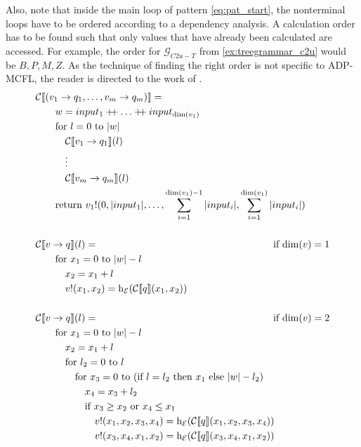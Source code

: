 \documentclass[
    a4paper,
    12pt,
    twoside,
    BCOR=12mm,
    parskip=half,
    chapterprefix,
    numbers=noenddot,
    bibliography=totoc
]{scrbook}
\begin{document}
Also, note that inside the main loop of pattern \ref{eq:pat_start}, the nonterminal loops have to be ordered according to a dependency analysis. A calculation order has to be found such that only values that have already been calculated are accessed. For example, the order for $\mathcal{G}_{C2u-T}$ from \cref{ex:treegrammar_c2u} would be $B,P,M,Z$. As the technique of finding the right order is not specific to ADP-MCFL, the reader is directed to the work of \citet[sect. 4.3]{steffen_compiling_2006}.
\begin{align}
	&\mathcal{C}\llbracket (v_1 \to q_1,\ldots, v_m \to q_m) \rrbracket = && \label{eq:pat_start} \\
		&\qquad \mathrlap{w = input_1 \concat \ldots \concat input_{\op{dim}(v_1)}} \nonumber\\
		&\qquad \mathrlap{ \text{for $l=0$ to $|w|$} } \nonumber\\
    &\qquad\quad \mathrlap{\mathcal{C}\llbracket v_1 \to q_1 \rrbracket(l)} \nonumber\\
		&\qquad\quad \vdots \nonumber\\
		&\qquad\quad \mathrlap{\mathcal{C}\llbracket v_m \to q_m \rrbracket(l)} \nonumber\\
		&\qquad \mathrlap{\text{return } v_1!(0,|input_1|, \ldots, \sum\limits_{i=1}^{\op{dim}(v_1)-1} |input_i|, \sum\limits_{i=1}^{\op{dim}(v_1)} |input_i|)} \nonumber\\
  \nonumber\\
	&\mathcal{C}\llbracket v \to q \rrbracket(l) = && \text{if $\op{dim}(v)=1$} \label{eq:pat_loop_dim1} \\
    &\qquad \text{for $x_1=0$ to $|w|-l$} \nonumber\\
    &\qquad\quad x_2 = x_1+l \nonumber\\
		&\qquad\quad v!(x_1,x_2) = \op{h}_\mathcal{E}(\mathcal{C}\llbracket q \rrbracket (x_1,x_2)) \nonumber \\
  \nonumber\\
	&\mathcal{C}\llbracket v \to q \rrbracket(l) = && \text{if $\op{dim}(v)=2$} \label{eq:pat_loop_dim2} \\
    &\qquad \text{for $x_1=0$ to $|w|-l$} \nonumber\\
    &\qquad\quad x_2 = x_1+l \nonumber\\
    &\qquad\quad \text{for $l_2=0$ to $l$} \nonumber\\
    &\qquad\quad\quad \text{for $x_3=0$ to $($if $l=l_2$ then $x_1$ else $|w|-l_2)$} \nonumber\\
    &\qquad\quad\quad\quad x_4 = x_3 + l_2 \nonumber\\
    &\qquad\quad\quad\quad \text{if $x_3 \geq x_2$ or $x_4 \leq x_1$} \nonumber\\
		&\qquad\quad\quad\quad\quad \mathrlap{v!(x_1,x_2,x_3,x_4) = \op{h}_\mathcal{E}(\mathcal{C}\llbracket q \rrbracket (x_1,x_2,x_3,x_4))} \nonumber\\
    &\qquad\quad\quad\quad\quad \mathrlap{v!(x_3,x_4,x_1,x_2) = \op{h}_\mathcal{E}(\mathcal{C}\llbracket q \rrbracket (x_3,x_4,x_1,x_2))} \nonumber
\end{align}
\end{document}
